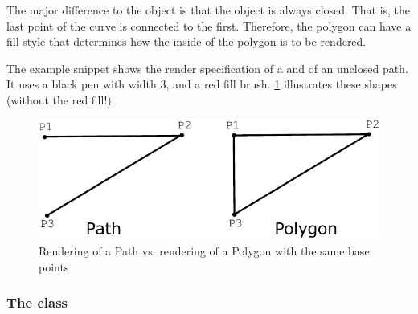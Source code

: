 The major difference to the \RenderCurve 
object is that the object is always closed. 
That is, the last point of the curve is connected to the first.
Therefore, the polygon can have a fill style 
that determines how the inside of the polygon is to be rendered.

The example snippet shows the render specification of a \Polygon and of an unclosed path. It uses a 
black pen with width 3, and a red fill brush. \ref{PathVsPolygon} illustrates these shapes (without the red fill!).

{\footnotesize
{}
}

\begin{figure}[!ht]
\begin{center}
\includegraphics{figures/PathVsPolygon.pdf}
\end{center}
\caption{Rendering of a Path vs. rendering of a Polygon with the same base points}
\label{PathVsPolygon}
\end{figure}



\subsubsection{The  class}
\label{renderrectangle-class}

